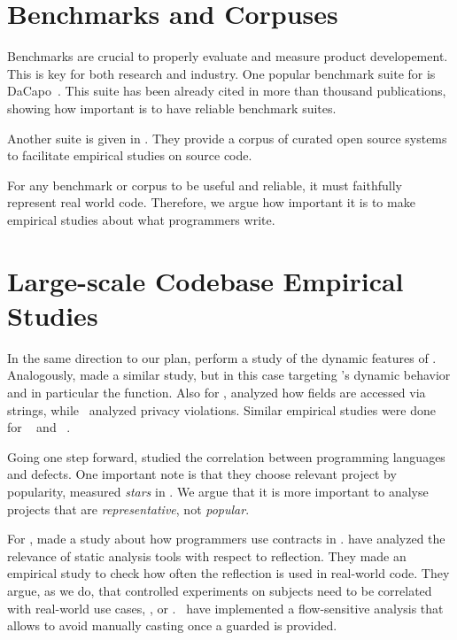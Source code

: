 \section{Benchmarks and Corpuses} \label{sec:benchmarks}

Benchmarks are crucial to properly evaluate and measure product developement.
This is key for both research and industry.
One popular benchmark suite for \java{} is DaCapo~\cite{blackburn_dacapo_2006}.
This suite has been already cited in more than thousand publications, showing how important is to have reliable benchmark suites.

Another suite is given in \cite{tempero_qualitas_2010}.
They provide a corpus of curated open source systems to facilitate empirical studies on source code.

For any benchmark or corpus to be useful and reliable, it must faithfully represent real world code.
Therefore, we argue how important it is to make empirical studies about what programmers write.


\section{Large-scale Codebase Empirical Studies}

\label{sec:large-scale}

In the same direction to our plan, \cite{callau_how_2013} perform a study of the dynamic features of \smalltalk{}.
Analogously, \cite{richards_analysis_2010,richards_eval_2011} made a similar study, but in this case targeting \javascript{}'s dynamic behavior and in particular the \eval{} function.
Also for \javascript{}, \cite{madsen_string_2014} analyzed how fields are accessed via strings, while~\cite{jang_empirical_2010} analyzed privacy violations.
Similar empirical studies were done for \php{}~
\cite{hills_empirical_2013,dahse_experience_2015,doyle_empirical_2011} and \swift{}~\cite{reboucas_empirical_2016}.

Going one step forward, \cite{ray_large-scale_2017} studied the correlation between programming languages and defects.
One important note is that they choose relevant project by popularity, measured \emph{stars} in \github{}.
We argue that it is more important to analyse projects that are \emph{representative}, not \emph{popular}.

For \java{}, \cite{dietrich_contracts_2017-1} made a study about how programmers use contracts in \mavencentral{}.
\cite{landman_challenges_2017} have analyzed the relevance of static analysis tools with respect to reflection.
They made an empirical study to check how often the reflection \api{} is used in real-world code.
They argue, as we do, that controlled experiments on subjects need to be correlated with real-world use cases, \eg{}, \github{} or \mavencentral{}.
\cite{winther_guarded_2011}~have implemented a flow-sensitive analysis that allows to avoid manually casting once a guarded \instanceof{} is provided.


